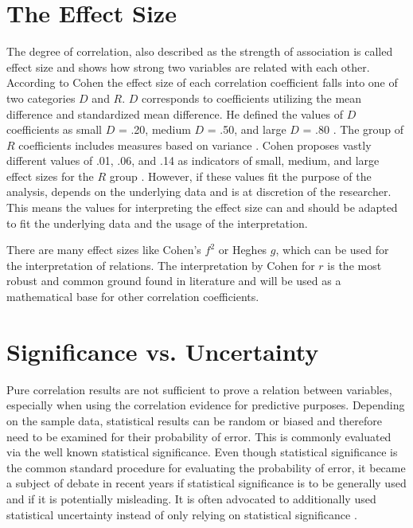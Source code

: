 \section{The Effect Size}
\label{correlation_effect_size}
The degree of correlation, also described as the strength of association is called effect size and shows how strong two variables are related with each other. According to Cohen \parencite{Cohen1988} the effect size of each correlation coefficient falls into one of two categories $D$ and $R$. $D$ corresponds to coefficients utilizing the mean difference and standardized mean difference. He defined the values of $D$ coefficients as small $D$ = .20, medium $D$ = .50, and large $D$ = .80 \parencite{Piegorsch2002}. The group of $R$ coefficients includes measures based on variance \parencite{Walker2005}. Cohen proposes vastly different values of .01, .06, and .14 as indicators of small, medium, and large effect sizes for the $R$ group \parencite{Cohen1988}. However, if these values fit the purpose of the analysis, depends on the underlying data and is at discretion of the researcher. This means the values for interpreting the effect size can and should be adapted to fit the underlying data and the usage of the interpretation.


There are many effect sizes like Cohen's $f^2$ or Heghes $g$, which can be used for the interpretation of relations. The interpretation by Cohen for $r$ is the most robust and common ground found in literature and will be used as a mathematical base for other correlation coefficients.

\section{Significance vs. Uncertainty}
\label{correlation_significance_uncertainty}
Pure correlation results are not sufficient to prove a relation between variables, especially when using the correlation evidence for predictive purposes. Depending on the sample data, statistical results can be random or biased and therefore need to be examined for their probability of error. This is commonly evaluated via the well known statistical significance. Even though statistical significance is the common standard procedure for evaluating the probability of error, it became a subject of debate in recent years if statistical significance is to be generally used and if it is potentially misleading. It is often advocated to additionally used statistical uncertainty instead of only relying on statistical significance \parencite{Harris2019}.

